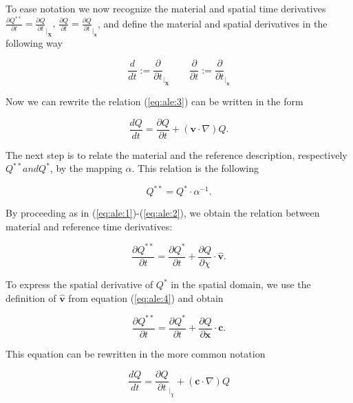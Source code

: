 \documentclass[a4paper,11pt,openright,twoside]{book}
\begin{document}
To ease notation we now recognize the material and spatial time derivatives $\frac{\partial Q^{**}}{\partial t} = \frac{\partial Q}{\partial t}_{|_\mathbf{X}}, \,  \frac{\partial Q}{\partial t} = \frac{\partial Q}{\partial t}_{|_\mathbf{x}}$, and define the material and spatial derivatives in the following way

\begin{equation}
\frac{d}{dt} := 	\frac{\partial}{\partial t}_{|_\mathbf{X}} \qquad
\frac{\partial}{\partial t} := \frac{\partial}{\partial t}_{|_\mathbf{x}}
\end{equation}

Now we can rewrite the relation (\ref{eq:ale:3}) can be written in the form

\begin{equation}
\label{eq:ale:6}
\frac{d Q}{d t} = \frac{\partial Q}{\partial t} + (\mathbf{v} \cdot \nabla) Q.
\end{equation}

The next step is to relate the material and the reference description, respectively $Q^{**} and Q^{*}$, by the mapping $\alpha$. This relation is the following

\begin{equation}
Q^{**} = Q^{*} \cdot \alpha^{-1}.
\end{equation}

By proceeding as in (\ref{eq:ale:1})-(\ref{eq:ale:2}), we obtain the relation between material and reference time derivatives:

\begin{equation}
\label{eq:ale:3}
\frac{\partial Q^{**}}{\partial t} = \frac{\partial Q^{*}}{\partial t}
+ \frac{\partial Q}{\partial \chi} \cdot \hat{\mathbf{v}}.
\end{equation}

To express the spatial derivative of $Q^{*}$ in the spatial domain, we use the definition of $\hat{\mathbf{v}}$ from equation (\ref{eq:ale:4}) and obtain

\begin{equation}
\frac{\partial Q^{**}}{\partial t} = \frac{\partial Q^{*}}{\partial t}
+ \frac{\partial Q}{\partial \mathbf{x}} \cdot \mathbf{c}.
\end{equation}

This equation can be rewritten in the more common notation

\begin{equation}
\label{eq:ale:5}
\frac{d Q}{d t} = \frac{\partial Q}{\partial t}_{|_\chi} + (\mathbf{c} \cdot \nabla) Q
\end{equation}
\end{document}
